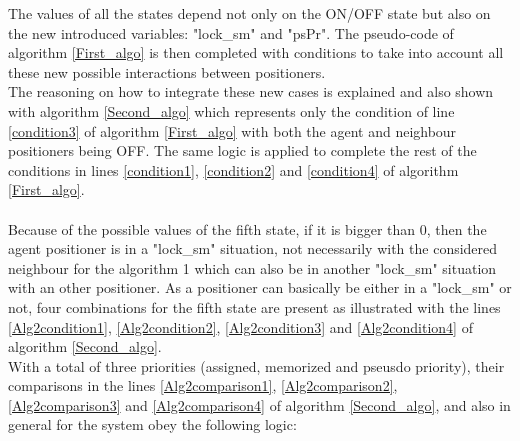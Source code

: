 \documentclass[]{spie}  %
\begin{document}
 The values of all the states depend not only on the ON/OFF state but also on the new introduced variables: "lock\_sm" and "psPr". The pseudo-code of algorithm \ref{First_algo} is then completed with conditions to take into account all these new possible interactions between positioners. \\
The reasoning on how to integrate these new cases is explained and also shown with algorithm \ref{Second_algo} which represents only the condition of line \ref{condition3} of algorithm \ref{First_algo} with both the agent and neighbour positioners being OFF. The same logic is applied to complete the rest of the conditions in lines \ref{condition1}, \ref{condition2} and \ref{condition4} of algorithm \ref{First_algo}.\\\\
Because of the possible values of the fifth state, if it is bigger than 0, then the agent positioner is in a "lock\_sm" situation, not necessarily with the considered neighbour for the algorithm 1 which can also be in another "lock\_sm" situation with an other positioner. As a positioner can basically be either in a "lock\_sm" or not, four combinations for the fifth state are present as illustrated with the lines \ref{Alg2condition1}, \ref{Alg2condition2}, \ref{Alg2condition3} and \ref{Alg2condition4} of algorithm \ref{Second_algo}.\\
With a total of three priorities (assigned, memorized and pseusdo priority), their comparisons in the lines \ref{Alg2comparison1}, \ref{Alg2comparison2}, \ref{Alg2comparison3} and \ref{Alg2comparison4} of algorithm \ref{Second_algo}, and also in general for the system obey the following logic:\\
\end{document}
